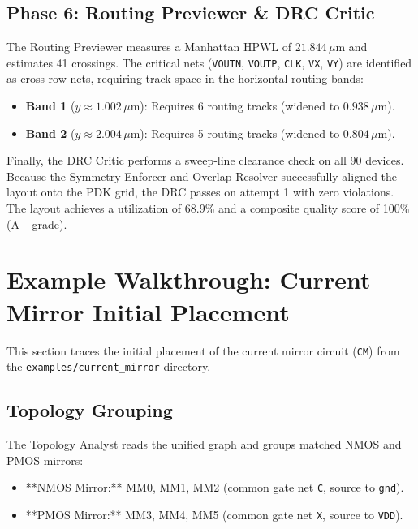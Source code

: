 \subsection{Phase 6: Routing Previewer \& DRC Critic}
The Routing Previewer measures a Manhattan HPWL of $21.844\,\mu\text{m}$ and estimates 41 crossings. The critical nets (\texttt{VOUTN}, \texttt{VOUTP}, \texttt{CLK}, \texttt{VX}, \texttt{VY}) are identified as cross-row nets, requiring track space in the horizontal routing bands:
\begin{itemize}
    \item \textbf{Band 1} ($y \approx 1.002\,\mu\text{m}$): Requires 6 routing tracks (widened to $0.938\,\mu\text{m}$).
    \item \textbf{Band 2} ($y \approx 2.004\,\mu\text{m}$): Requires 5 routing tracks (widened to $0.804\,\mu\text{m}$).
\end{itemize}

Finally, the DRC Critic performs a sweep-line clearance check on all 90 devices. Because the Symmetry Enforcer and Overlap Resolver successfully aligned the layout onto the PDK grid, the DRC passes on attempt 1 with zero violations. The layout achieves a utilization of 68.9\% and a composite quality score of 100\% (A+ grade).

\section[Current Mirror Walkthrough]{Example Walkthrough: Current Mirror Initial Placement}
\label{sec:walkthrough_placer}

This section traces the initial placement of the current mirror circuit (\texttt{CM}) from the \texttt{examples/current\_mirror} directory.

\subsection{Topology Grouping}
The Topology Analyst reads the unified graph and groups matched NMOS and PMOS mirrors:
\begin{itemize}
    \item **NMOS Mirror:** MM0, MM1, MM2 (common gate net \texttt{C}, source to \texttt{gnd}).
    \item **PMOS Mirror:** MM3, MM4, MM5 (common gate net \texttt{X}, source to \texttt{VDD}).
\end{itemize}


